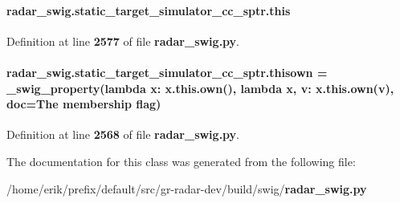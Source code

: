 \paragraph[{this}]{\setlength{\rightskip}{0pt plus 5cm}radar\+\_\+swig.\+static\+\_\+target\+\_\+simulator\+\_\+cc\+\_\+sptr.\+this}\label{classradar__swig_1_1static__target__simulator__cc__sptr_a97487e6628a71363d25f66be6182de77}


Definition at line {\bf 2577} of file {\bf radar\+\_\+swig.\+py}.

\paragraph[{thisown}]{\setlength{\rightskip}{0pt plus 5cm}radar\+\_\+swig.\+static\+\_\+target\+\_\+simulator\+\_\+cc\+\_\+sptr.\+thisown = {\bf \+\_\+swig\+\_\+property}(lambda x\+: x.\+this.\+own(), lambda {\bf x}, v\+: x.\+this.\+own(v), doc=\textquotesingle{}The membership flag\textquotesingle{})\hspace{0.3cm}{\ttfamily [static]}}\label{classradar__swig_1_1static__target__simulator__cc__sptr_abffb08d0f66eda99881d39ef249d4a95}


Definition at line {\bf 2568} of file {\bf radar\+\_\+swig.\+py}.



The documentation for this class was generated from the following file\+:\begin{DoxyCompactItemize}
\item 
/home/erik/prefix/default/src/gr-\/radar-\/dev/build/swig/{\bf radar\+\_\+swig.\+py}\end{DoxyCompactItemize}
